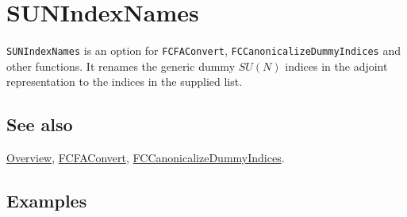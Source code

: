 \documentclass[../FeynCalcManual.tex]{subfiles}
\begin{document}
\hypertarget{sunindexnames}{
\section{SUNIndexNames}\label{sunindexnames}}

\texttt{SUNIndexNames} is an option for \texttt{FCFAConvert},
\texttt{FCCanonicalizeDummyIndices} and other functions. It renames the
generic dummy \(SU(N)\) indices in the adjoint representation to the
indices in the supplied list.

\subsection{See also}

\hyperlink{toc}{Overview}, \hyperlink{fcfaconvert}{FCFAConvert},
\hyperlink{fccanonicalizedummyindices}{FCCanonicalizeDummyIndices}.

\subsection{Examples}
\end{document}
